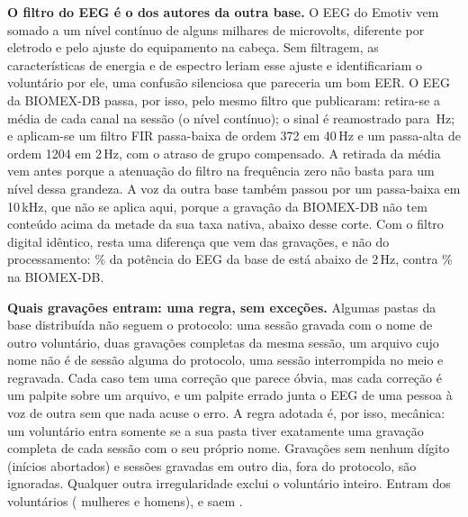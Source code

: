 		\par \textbf{O filtro do \ac{EEG} é o dos autores da outra base.} O \ac{EEG} do Emotiv vem somado a um nível contínuo de alguns milhares de microvolts, diferente por eletrodo e pelo ajuste do equipamento na cabeça. Sem filtragem, as características de energia e de espectro leriam esse ajuste e identificariam o voluntário por ele, uma confusão silenciosa que pareceria um bom \ac{EER}. O \ac{EEG} da BIOMEX-DB passa, por isso, pelo mesmo filtro que  publicaram: retira-se a média de cada canal na sessão (o nível contínuo); o sinal é reamostrado para \,Hz; e aplicam-se um filtro FIR passa-baixa de ordem 372 em 40\,Hz e um passa-alta de ordem 1204 em 2\,Hz, com o atraso de grupo compensado. A retirada da média vem antes porque a atenuação do filtro na frequência zero não basta para um nível dessa grandeza. A voz da outra base também passou por um passa-baixa em 10\,kHz, que não se aplica aqui, porque a gravação da BIOMEX-DB não tem conteúdo acima da metade da sua taxa nativa, abaixo desse corte. Com o filtro digital idêntico, resta uma diferença que vem das gravações, e não do processamento: \% da potência do \ac{EEG} da base de  está abaixo de 2\,Hz, contra \% na BIOMEX-DB.

		\par \textbf{Quais gravações entram: uma regra, sem exceções.} Algumas pastas da base distribuída não seguem o protocolo: uma sessão gravada com o nome de outro voluntário, duas gravações completas da mesma sessão, um arquivo cujo nome não é de sessão alguma do protocolo, uma sessão interrompida no meio e regravada. Cada caso tem uma correção que parece óbvia, mas cada correção é um palpite sobre um arquivo, e um palpite errado junta o \ac{EEG} de uma pessoa à voz de outra sem que nada acuse o erro. A regra adotada é, por isso, mecânica: um voluntário entra somente se a sua pasta tiver exatamente uma gravação completa de cada sessão com o seu próprio nome. Gravações sem nenhum dígito (inícios abortados) e sessões gravadas em outro dia, fora do protocolo, são ignoradas. Qualquer outra irregularidade exclui o voluntário inteiro. Entram  dos  voluntários ( mulheres e  homens), e saem .

